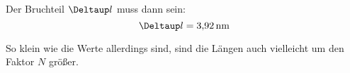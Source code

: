 Der Bruchteil $\Deltaup l$ muss dann sein:
\[
	\Deltaup l = \SI{3.92}{\nano\meter}
\]

So klein wie die Werte allerdings sind, sind die Längen auch vielleicht um den
Faktor $N$ größer.


\IfFileExists{\bibliographyfile}{
}{}



